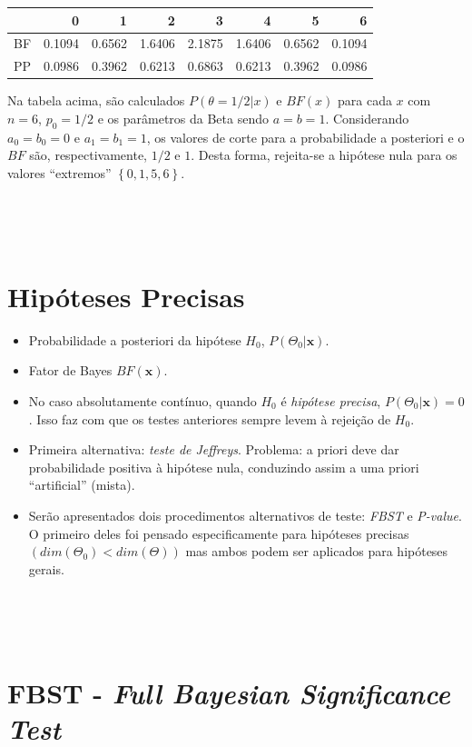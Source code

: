\documentclass[
]{book}
\begin{document}
\begin{tabular}{lrrrrrrr}
\toprule
  & 0 & 1 & 2 & 3 & 4 & 5 & 6\\
\midrule
BF & 0.1094 & 0.6562 & 1.6406 & 2.1875 & 1.6406 & 0.6562 & 0.1094\\
PP & 0.0986 & 0.3962 & 0.6213 & 0.6863 & 0.6213 & 0.3962 & 0.0986\\
\bottomrule
\end{tabular}

Na tabela acima, são calculados \(P(\theta=1/2|x)\) e \(BF(x)\) para cada \(x\) com \(n=6\), \(p_0=1/2\) e os parâmetros da Beta sendo \(a=b=1\). Considerando \(a_0=b_0=0\) e \(a_1=b_1=1\), os valores de corte para a probabilidade a posteriori e o \(BF\) são, respectivamente, \(1/2\) e \(1\). Desta forma, rejeita-se a hipótese nula para os valores ``extremos'' \(\left\{0,1,5,6\right\}\).

\(~\)

\(~\)

\hypertarget{hipuxf3teses-precisas}{%
\section{Hipóteses Precisas}\label{hipuxf3teses-precisas}}

\begin{itemize}
\item
  Probabilidade a posteriori da hipótese \(H_0\), \(P(\Theta_0|\boldsymbol x)\).
\item
  Fator de Bayes \(BF(\boldsymbol x)\).
\item
  No caso absolutamente contínuo, quando \(H_0\) é \emph{hipótese precisa}, \(P(\Theta_0|\boldsymbol x)=0\). Isso faz com que os testes anteriores sempre levem à rejeição de \(H_0\).
\item
  Primeira alternativa: \emph{teste de Jeffreys}. Problema: a priori deve dar probabilidade positiva à hipótese nula, conduzindo assim a uma priori ``artificial'' (mista).
\item
  Serão apresentados dois procedimentos alternativos de teste: \emph{FBST} e \emph{P-value}. O primeiro deles foi pensado especificamente para hipóteses precisas \(\left(dim(\Theta_0)<dim(\Theta)\right)\) mas ambos podem ser aplicados para hipóteses gerais.
\end{itemize}

\(~\)

\(~\)

\hypertarget{fbst---full-bayesian-significance-test}{%
\section{\texorpdfstring{FBST - \emph{Full Bayesian Significance Test}}{FBST - Full Bayesian Significance Test}}\label{fbst---full-bayesian-significance-test}}
\end{document}

